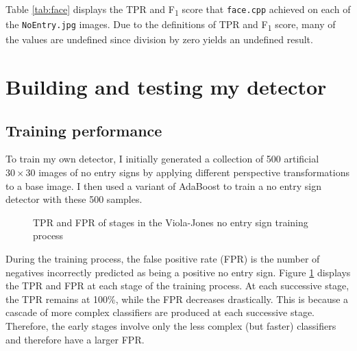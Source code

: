 \documentclass[twocolumn, 10pt, a4paper]{article}
\begin{document}
Table \ref{tab:face} displays the TPR and F\textsubscript{1} score that \texttt{face.cpp} achieved on each of the \texttt{NoEntry\textasteriskcentered.jpg} images.
Due to the definitions of TPR and F\textsubscript{1} score, many of the values are undefined since division by zero yields an undefined result.

\clearpage

\section{Building and testing my detector}

\subsection{Training performance}

To train my own detector, I initially generated a collection of 500 artificial $30 \times 30$ images of no entry signs by applying different perspective transformations to a base image.
I then used a variant of AdaBoost to train a no entry sign detector with these 500 samples.

\begin{figure}[h]
  \dataset
  \caption{TPR and FPR of stages in the Viola-Jones no entry sign training process}\label{vj_training}
\end{figure}

During the training process, the false positive rate (FPR) is the number of negatives incorrectly predicted as being a positive no entry sign.
Figure \ref{vj_training} displays the TPR and FPR at each stage of the training process.
At each successive stage, the TPR remains at 100\%, while the FPR decreases drastically.
This is because a cascade of more complex classifiers are produced at each successive stage.
Therefore, the early stages involve only the less complex (but faster) classifiers and therefore have a larger FPR.
 
\end{document}

